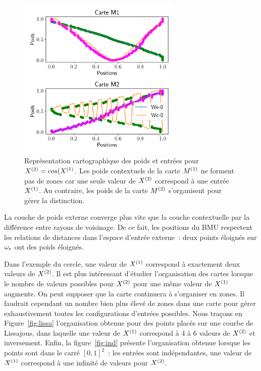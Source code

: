 \documentclass[../main]{subfiles}
\begin{document}
	\begin{figure}
		\centering\includegraphics[width=0.7\textwidth]{2som_cos_w.pdf}
		\caption{Représentation cartographique des poids et entrées pour $X^{({2})} = cos(X^{({1})}$. Les poids contextuels de la carte $M^{({1})}$ ne forment pas de zones car une seule valeur de $X^{({2})}$ correspond à une entrée $X^{({1})}$. Au contraire, les poids de la carte $M^{({2})}$ s'organisent pour gérer la distinction. \label{fig:cos_results}}
	\end{figure}

La couche de poids externe converge plus vite que la couche contextuelle par la différence entre rayons de voisinage. De ce fait, les positions du BMU respectent les relations de distances dans l'espace d'entrée externe~: deux points éloignés sur $\omega_e$ ont des poids éloignés.

Dans l'exemple du cercle, une valeur de $X^{({1})}$ correspond à exactement deux valeurs de $X^{({2})}$. Il est plus intéressant d'étudier l'organisation des cartes lorsque le nombre de valeurs possibles pour $X^{({2})}$ pour une même valeur de $X^{({1})}$ augmente. On peut supposer que la carte continuera à s'organiser en zones. 
Il faudrait cependant un nombre bien plus élevé de zones dans une carte pour gérer exhaustivement toutes les configurations d'entrées possibles.
Nous traçons en Figure~\ref{fig:lissa} l'organisation obtenue pour des points placés sur une courbe de Lissajous, dans laquelle une valeur de $X^{({1})}$ correspond à 4 à 6 valeurs de $X^{({2})}$ et inversement. 
Enfin, la figure~\ref{fig:ind} présente l'organisation obtenue lorsque les points sont dans le carré $[0,1]^2$~: les entrées sont indépendantes, une valeur de $X^{({1})}$ correspond à une infinité de valeurs pour $X^{({2})}$. 
\end{document}
